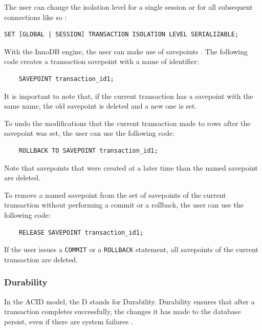 \documentclass[12pt]{article}
\newcounter{subsubsubsection}[subsubsection]
\begin{document}
\vspace{0.3cm}

\noindent The user can change the isolation level for a single session or for all subsequent connections like so \parencite{setTransaction}:

\begin{verbatim}
SET [GLOBAL | SESSION] TRANSACTION ISOLATION LEVEL SERIALIZABLE;
\end{verbatim}


\label{savepoints} 
With the InnoDB engine, the user can make use of savepoints \parencite{savepoints}. The following code creates a transaction savepoint with a name of identifier: 

\begin{verbatim}
    SAVEPOINT transaction_id1;
\end{verbatim}

It is important to note that, if the current transaction has a savepoint with the same name, the old savepoint is deleted and a new one is set.

\vspace{0.3cm}

To undo the modifications that the current transaction made to rows after the savepoint was set, the user can use the following code:
\begin{verbatim}
    ROLLBACK TO SAVEPOINT transaction_id1;
\end{verbatim}

Note that savepoints that were created at a later time than the named savepoint are deleted.

\vspace{0.3cm}

To remove a named savepoint from the set of savepoints of the current transaction without performing a commit or a rollback, the user can use the following code:
\begin{verbatim}
    RELEASE SAVEPOINT transaction_id1;
\end{verbatim}

If the user issues a \verb|COMMIT| or a \verb|ROLLBACK| statement, all savepoints of the current transaction are deleted.


\subsubsection{Durability}
\label{durability} 
In the ACID model, the D stands for Durability. Durability ensures that after a transaction completes successfully, the changes it has made to the database persist, even if there are system failures \parencite{AulaTransactions}.
\end{document}

